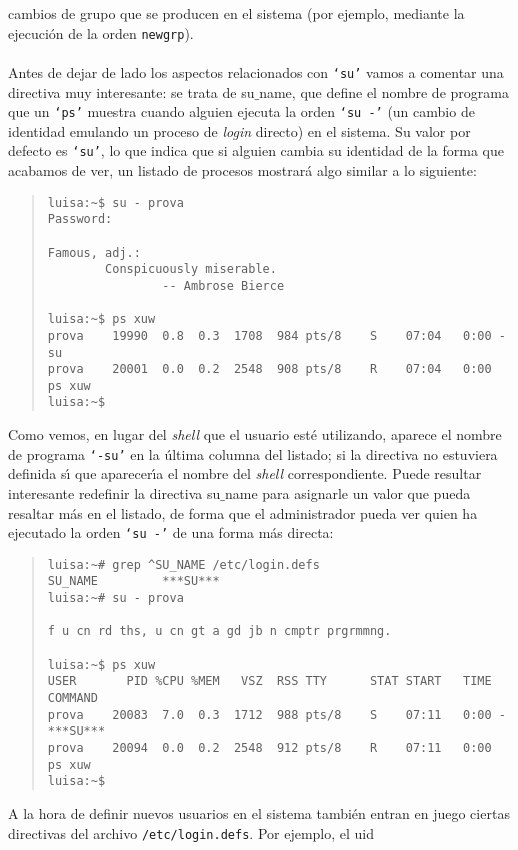 cambios de grupo que se producen en el sistema (por ejemplo, mediante la 
ejecuci\'on de la orden {\tt newgrp}).\\
\\Antes de dejar de lado los aspectos relacionados con {\tt `su'} vamos a 
comentar una directiva muy interesante: se trata de {\sc su$\_$name}, que 
define el nombre de programa que un {\tt `ps'} muestra cuando alguien ejecuta 
la orden {\tt `su -'} (un cambio de identidad emulando un proceso de {\it 
login} directo) en el sistema. Su valor por defecto es {\tt `su'}, lo que
indica que si alguien cambia su identidad de la forma que acabamos de ver, un
listado de procesos mostrar\'a algo similar a lo siguiente:
\begin{quote}
\begin{verbatim}
luisa:~$ su - prova
Password: 

Famous, adj.:
        Conspicuously miserable.
                -- Ambrose Bierce

luisa:~$ ps xuw
prova    19990  0.8  0.3  1708  984 pts/8    S    07:04   0:00 -su
prova    20001  0.0  0.2  2548  908 pts/8    R    07:04   0:00 ps xuw
luisa:~$ 
\end{verbatim}
\end{quote}
Como vemos, en lugar del {\it shell} que el usuario est\'e utilizando, aparece
el nombre de programa {\tt `-su'} en la \'ultima columna del listado; si la
directiva no estuviera definida s\'{\i} que aparecer\'{\i}a el nombre del {\it 
shell} correspondiente. Puede resultar interesante redefinir la directiva {\sc 
su$\_$name} para asignarle un valor que pueda resaltar m\'as en el listado, de
forma que el administrador pueda ver quien ha ejecutado la orden {\tt `su -'}
de una forma m\'as directa:
\begin{quote}
\begin{verbatim}
luisa:~# grep ^SU_NAME /etc/login.defs 
SU_NAME         ***SU***
luisa:~# su - prova

f u cn rd ths, u cn gt a gd jb n cmptr prgrmmng.

luisa:~$ ps xuw
USER       PID %CPU %MEM   VSZ  RSS TTY      STAT START   TIME COMMAND
prova    20083  7.0  0.3  1712  988 pts/8    S    07:11   0:00 -***SU***
prova    20094  0.0  0.2  2548  912 pts/8    R    07:11   0:00 ps xuw
luisa:~$ 
\end{verbatim}
\end{quote}
A la hora de definir nuevos usuarios en el sistema tambi\'en entran en juego
ciertas directivas del archivo {\tt /etc/login.defs}. Por ejemplo, el {\sc uid}
